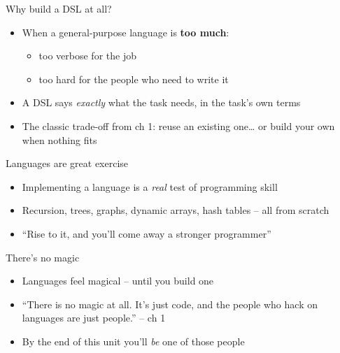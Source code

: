 \documentclass[
  ignorenonframetext,
]{beamer}
\providecommand{\tightlist}{%
  \setlength{\itemsep}{0pt}\setlength{\parskip}{0pt}}
\begin{document}
\begin{frame}{Why build a DSL at all?}
\label{why-build-a-dsl-at-all}
\begin{itemize}
\tightlist
\item
  When a general-purpose language is \textbf{too much}:

  \begin{itemize}
  \tightlist
  \item
    too verbose for the job
  \item
    too hard for the people who need to write it
  \end{itemize}
\item
  A DSL says \emph{exactly} what the task needs, in the task's own terms
\item
  The classic trade-off from ch 1: reuse an existing one\ldots{} or
  build your own when nothing fits
\end{itemize}

\end{frame}

\begin{frame}{Languages are great exercise}
\label{languages-are-great-exercise}
\begin{itemize}
\tightlist
\item
  Implementing a language is a \emph{real} test of programming skill
\item
  Recursion, trees, graphs, dynamic arrays, hash tables -- all from
  scratch
\item
  ``Rise to it, and you'll come away a stronger programmer''
\end{itemize}

\end{frame}

\begin{frame}{There's no magic}
\label{theres-no-magic}
\begin{itemize}
\tightlist
\item
  Languages feel magical -- until you build one
\item
  ``There is no magic at all. It's just code, and the people who hack on
  languages are just people.'' -- ch 1
\item
  By the end of this unit you'll \emph{be} one of those people
\end{itemize}

\end{frame}
\end{document}
